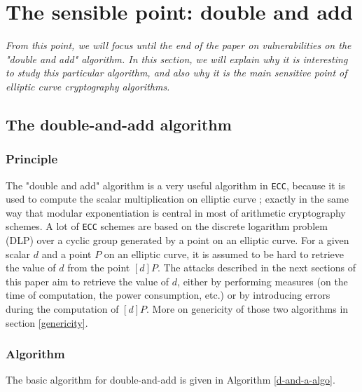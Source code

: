 \documentclass[journal]{IEEEtran}
\begin{document}


\section{The sensible point: double and add}

{\it From this point, we will focus until the end of the paper on vulnerabilities on the "double and add" algorithm. 
In this section, we will explain why it is interesting to study this particular algorithm, and also why it is the main sensitive point
of elliptic curve cryptography algorithms.}

\subsection{The double-and-add algorithm}

\subsubsection{Principle}
The "double and add" algorithm is a very useful algorithm in {\tt ECC}, because it is used to compute the scalar multiplication on elliptic curve ; 
exactly in the same way that modular exponentiation is central in most of arithmetic cryptography schemes. 
A lot of {\tt ECC} schemes are based on the discrete logarithm problem (DLP) over a cyclic group generated by a point on an elliptic curve.
For a given scalar $d$ and a point $P$ on an elliptic curve, it is assumed to be hard to retrieve the value of $d$ from the point $[d]P$. 
The attacks described in the next sections of this paper aim to retrieve the value of $d$, either by performing measures (on the time of computation, 
the power consumption, etc.) or by introducing errors during the computation of $[d]P$.
More on genericity of those two algorithms 
in section \ref{genericity}.\\

\subsubsection{Algorithm}
\label{sensible-point-algo}
The basic algorithm for double-and-add is given in Algorithm \ref{d-and-a-algo}.
\end{document}

